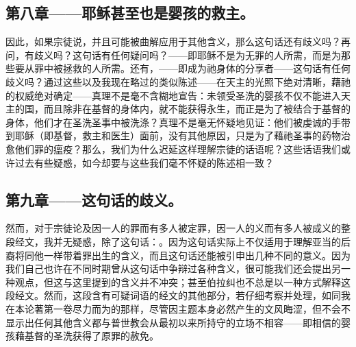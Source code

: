 \subsection{第八章——耶稣甚至也是婴孩的救主。}

因此，如果宗徒说，并且可能被曲解应用于其他含义，那么这句话还有歧义吗？再问，有歧义吗？这句话有任何疑问吗？——即耶稣不是为无罪的人所需，而是为那些要从罪中被拯救的人所需。还有，——即成为祂身体的分享者——这句话有任何歧义吗？通过这些以及我现在略过的类似陈述——在天主的光照下绝对清晰，藉祂的权威绝对确定——真理不是毫不含糊地宣告：未领受圣洗的婴孩不仅不能进入天主的国，而且除非在基督的身体内，就不能获得永生，而正是为了被结合于基督的身体，他们才在圣洗圣事中被洗涤？真理不是毫无怀疑地见证：他们被虔诚的手带到耶稣（即基督，救主和医生）面前，没有其他原因，只是为了藉祂圣事的药物治愈他们罪的瘟疫？那么，我们为什么迟延这样理解宗徒的话语呢？这些话语我们或许过去有些疑惑，如今却要与这些我们毫不怀疑的陈述相一致？\par


\subsection{第九章——这句话的歧义。}

然而，对于宗徒论及因一人的罪而有多人被定罪，因一人的义而有多人被成义的整段经文，我并无疑惑，除了这句话：。因为这句话实际上不仅适用于理解亚当的后裔将同他一样带着罪出生的含义，而且这句话还能被引申出几种不同的意义。因为我们自己也许在不同时期曾从这句话中争辩过各种含义，很可能我们还会提出另一种观点，但这与这里提到的含义并不冲突；甚至伯拉纠也不总是以一种方式解释这段经文。然而，这段含有可疑词语的经文的其他部分，若仔细考察并处理，如同我在本论著第一卷尽力而为的那样，尽管因主题本身必然产生的文风晦涩，但不会不显示出任何其他含义都与普世教会从最初以来所持守的立场不相容——即相信的婴孩藉基督的圣洗获得了原罪的赦免。\par



